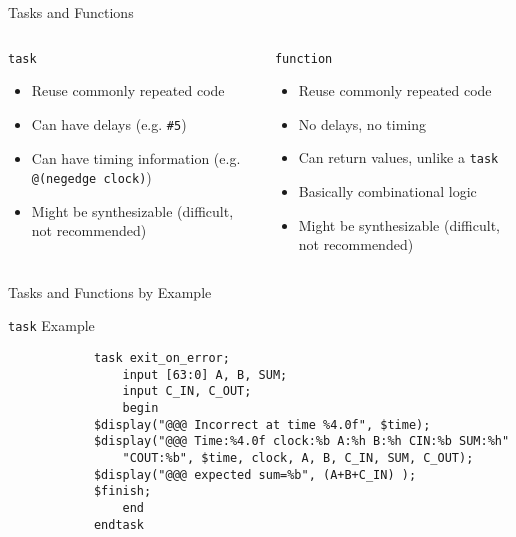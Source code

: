 \documentclass[table,dvipsnames,colorlinks=true]{beamer}
\begin{document}
\begin{frame}{Tasks and Functions}
    \begin{columns}
        \begin{column}[T]{0.45\textwidth}
            \begin{block}{\texttt{task}}
                \begin{itemize}
                    \item Reuse commonly repeated code
                    \item Can have delays (e.g. \texttt{\#5})
                    \item Can have timing information (e.g. \texttt{@(negedge
                        clock)})
                    \item Might be synthesizable (difficult, not recommended)
                \end{itemize}
            \end{block}
        \end{column}
        \begin{column}[T]{0.45\textwidth}
            \begin{block}{\texttt{function}}
                \begin{itemize}
                    \item Reuse commonly repeated code
                    \item No delays, no timing
                    \item Can return values, unlike a \texttt{task}
                    \item Basically combinational logic
                    \item Might be synthesizable (difficult, not recommended)
                \end{itemize}
            \end{block}
        \end{column}
    \end{columns}
\end{frame}

\begin{frame}[fragile]{Tasks and Functions by Example}
    \begin{block}{\texttt{task} Example}
        \vspace*{-12pt}
        \begin{verbatim}
            task exit_on_error;
                input [63:0] A, B, SUM;
                input C_IN, C_OUT;
                begin
            $display("@@@ Incorrect at time %4.0f", $time);
            $display("@@@ Time:%4.0f clock:%b A:%h B:%h CIN:%b SUM:%h"
                "COUT:%b", $time, clock, A, B, C_IN, SUM, C_OUT);
            $display("@@@ expected sum=%b", (A+B+C_IN) );
            $finish;
                end
            endtask
        \end{verbatim}
    \end{block}
\end{frame}
\end{document}
